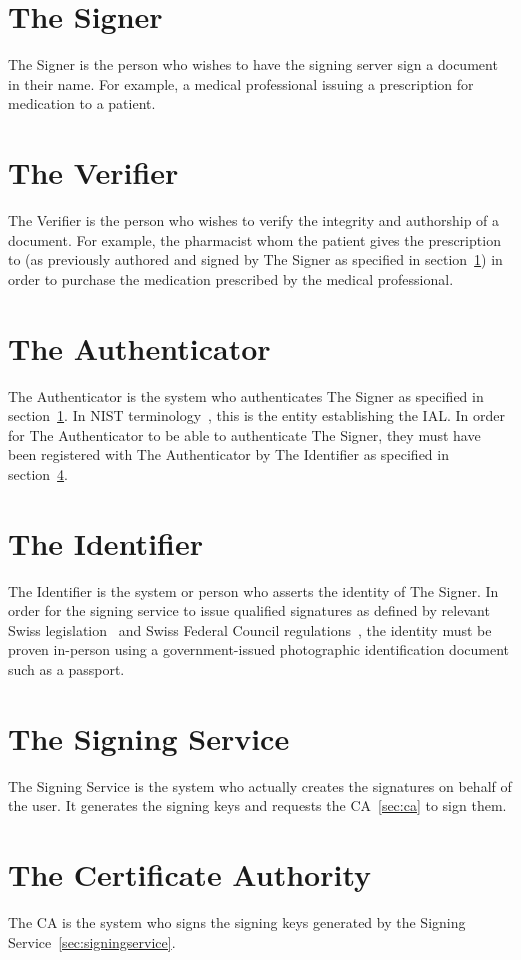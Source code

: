 \section{The Signer}
\label{sec:actorsigner}
The Signer is the person who wishes to have the signing server sign a document in their name.
For example, a medical professional issuing a prescription for medication to a patient.

\section{The Verifier}
\label{sec:actorverifier}
The Verifier is the person who wishes to verify the integrity and authorship of a document.
For example, the pharmacist whom the patient gives the prescription to (as previously authored and signed by The Signer as specified in section~\ref{sec:actorsigner}) in order to purchase the medication prescribed by the medical professional.

\section{The Authenticator}
\label{sec:actorauthenticator}
The Authenticator is the system who authenticates The Signer as specified in section~\ref{sec:actorsigner}.
In \gls{NIST} terminology~\cite{nistdigitalidentityguidelines}, this is the entity establishing the \gls{IAL}.
In order for The Authenticator to be able to authenticate The Signer,
they must have been registered with The Authenticator by The Identifier as specified in section~\ref{sec:authoridentifier}.

\section{The Identifier}
\label{sec:authoridentifier}
The Identifier is the system or person who asserts the identity of The Signer.
In order for the signing service to issue qualified signatures as defined by relevant Swiss legislation~\cite{zertes} and Swiss Federal Council regulations~\cite{vzertes},
the identity must be proven in-person using a government-issued photographic identification document such as a passport.

\section{The Signing Service}
\label{sec:actorsigningservice}
The Signing Service is the system who actually creates the signatures on behalf of the user.
It generates the signing keys and requests the \gls{CA}~\ref{sec:ca} to sign them.

\section{The Certificate Authority}
\label{sec:actorca}
The \gls{CA} is the system who signs the signing keys generated by the Signing Service~\ref{sec:signingservice}.
